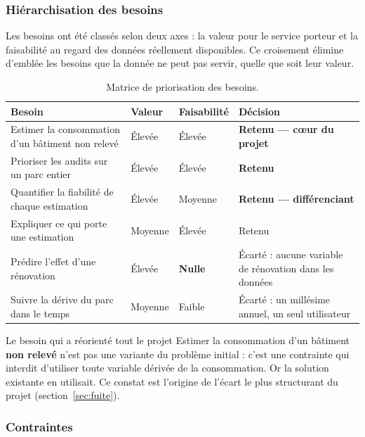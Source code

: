 \subsubsection*{Hiérarchisation des besoins}

Les besoins ont été classés selon deux axes : la valeur pour le service porteur
et la faisabilité au regard des données réellement disponibles. Ce croisement
élimine d'emblée les besoins que la donnée ne peut pas servir, quelle que soit
leur valeur.

\begin{table}[H]
\centering
\small
\begin{tabularx}{\linewidth}{@{}L{5.4cm}C{2.2cm}C{2.4cm}L{3.6cm}@{}}
\toprule
\textbf{Besoin} & \textbf{Valeur} & \textbf{Faisabilité} & \textbf{Décision} \\
\midrule
Estimer la consommation d'un bâtiment non relevé & Élevée & Élevée & \textbf{Retenu — cœur du projet} \\
Prioriser les audits sur un parc entier & Élevée & Élevée & \textbf{Retenu} \\
Quantifier la fiabilité de chaque estimation & Élevée & Moyenne & \textbf{Retenu — différenciant} \\
Expliquer ce qui porte une estimation & Moyenne & Élevée & Retenu \\
Prédire l'effet d'une rénovation & Élevée & \textbf{Nulle} & Écarté : aucune variable de rénovation dans les données \\
Suivre la dérive du parc dans le temps & Moyenne & Faible & Écarté : un millésime annuel, un seul utilisateur \\
\bottomrule
\end{tabularx}
\caption{Matrice de priorisation des besoins.}
\end{table}

\begin{constat}{Le besoin qui a réorienté tout le projet}
Estimer la consommation d'un bâtiment \textbf{non relevé} n'est pas une variante
du problème initial : c'est une contrainte qui interdit d'utiliser toute variable
dérivée de la consommation. Or la solution existante en utilisait. Ce constat est
l'origine de l'écart le plus structurant du projet (section~\ref{sec:fuite}).
\end{constat}

\subsubsection*{Contraintes}


